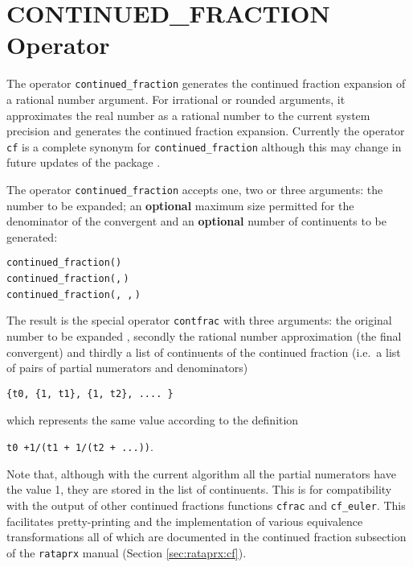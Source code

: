 \section{CONTINUED\_FRACTION Operator}
\hypertarget{operator:CONTINUED_FRACTION}{}
\hypertarget{operator:CONTFRAC}{}

The operator \texttt{continued\_fraction}
generates the continued fraction expansion of a rational number argument.
For irrational or rounded arguments, it approximates the real number
as a rational number to the current system precision and generates
the continued fraction expansion. Currently the operator \texttt{cf} is a
complete synonym for \texttt{continued\_fraction} although this may change
in future updates of the package .

The operator \texttt{continued\_fraction} accepts one, two or
three arguments: the number to be expanded; an \textbf{optional} maximum size
permitted for the denominator of the convergent
and an \textbf{optional} number of continuents to be generated:
\begin{syntaxtable}
  \texttt{continued\_fraction(}\texttt{)}\\
  \texttt{continued\_fraction(}\texttt{,}\,\texttt{)}\\
  \texttt{continued\_fraction(}\texttt{,}\,%
  \texttt{,}\,\texttt{)}
\end{syntaxtable}
The result is the special operator \texttt{contfrac}
with three arguments: the original number to be expanded
, secondly the rational number approximation (the final convergent)
and thirdly a list of continuents of the continued fraction (i.e.\ a list of
pairs of partial numerators and denominators)

\hspace{10mm}\texttt{\{t0, \{1, t1\}, \{1, t2\}, .... \}}

which represents the same value according to the definition

\hspace{10mm}\texttt{t0 +1/(t1 + 1/(t2 + ...))}.

Note that, although with the current
algorithm all the partial numerators have the value 1, they are stored
in the list of continuents. This is for compatibility with the output of
other continued fractions functions \texttt{cfrac} and \texttt{cf\_euler}.
This facilitates pretty-printing and the implementation of various equivalence
transformations all of which are documented in the continued fraction
subsection of the \texttt{rataprx} manual (Section \ref{sec:rataprx:cf}).

